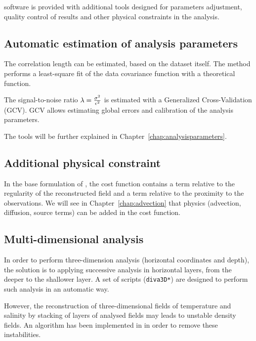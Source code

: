 \diva software is provided with additional tools designed for parameters adjustment, quality control of results and other physical constraints in the analysis.

\subsection{Automatic estimation of analysis parameters}

The correlation length can be estimated, based on the dataset itself. The method performs a least-square fit of the data covariance function with a theoretical function. 

The signal-to-noise ratio $\lambda=\frac{\sigma^{2}}{\epsilon^{2}}$ is estimated with a Generalized Cross-Validation (GCV). GCV allows estimating global errors and calibration of the analysis parameters. 

The tools will be further explained in Chapter~\ref{chap:analysisparameters}.
 
\subsection{Additional physical constraint}

In the base formulation of \diva, the cost function contains a term relative to the regularity of the reconstructed field and a term relative to the proximity to the observations. We will see in Chapter~\ref{chap:advection} that physics (advection, diffusion, source terms) can be added in the cost function.

\subsection{Multi-dimensional analysis}

In order to perform three-dimension analysis (horizontal coordinates and depth), the solution is to applying successive analysis in horizontal layers, from the deeper to the shallower layer. A set of scripts (\texttt{diva3D*}) are designed to perform such analysis in an automatic way.

However, the reconstruction of three-dimensional fields of temperature and salinity by stacking of layers of analysed fields may leads to unstable density fields. An algorithm has been implemented in \diva in order to remove these instabilities.

